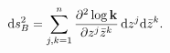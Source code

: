 \begin{equation}
{\rm d}s^2_B=\sum_{j,k=1}^n {\partial^2 \log {\bf k}\over \partial z^j \bar z^k}
\,{\rm d}z^j {\rm d}\bar z^k.
\label{bbmmff}
\end{equation}

